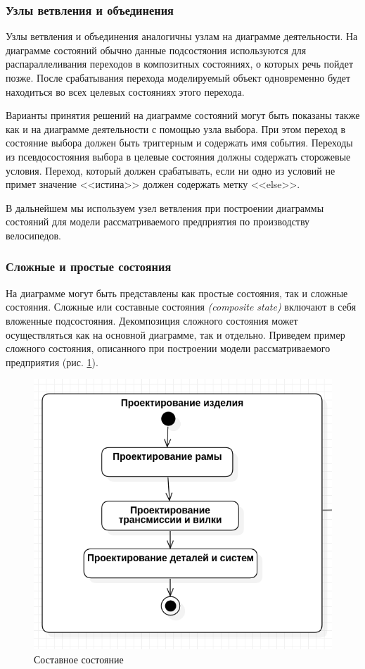 \documentclass[a4paper,12pt]{report}
\begin{document}
\subsubsection*{Узлы ветвления и объединения}
Узлы ветвления и объединения аналогичны узлам на диаграмме деятельности. На диаграмме состояний обычно данные подсостяония используются для распараллеливания переходов в композитных состояниях, о которых речь пойдет позже. После срабатывания перехода моделируемый объект одновременно будет находиться во всех целевых состояниях этого перехода. 

Варианты принятия решений на диаграмме состояний могут быть показаны также как и на диаграмме деятельности с помощью узла выбора. При этом переход в состояние выбора должен быть триггерным и содержать имя события. Переходы из псевдосостояния выбора в целевые состояния должны содержать сторожевые условия. Переход, который должен срабатывать, если ни одно из условий не примет значение <<истина>> должен содержать метку <<else>>. 

В дальнейшем мы используем узел ветвления при построении диаграммы состояний для модели рассматриваемого предприятия по производству велосипедов.

\subsubsection*{Сложные и простые состояния}

На диаграмме могут быть представлены как простые состояния, так и сложные состояния. Сложные или составные состояния \textit{(composite state)}  включают в себя вложенные подсостояния.  Декомпозиция сложного состояния может осуществляться как на основной диаграмме, так и отдельно. Приведем пример сложного состояния, описанного при построении модели рассматриваемого предприятия (рис. \ref{fig:statechartcomposestate}).

\begin{figure}
	\centering
	\includegraphics[width=0.4\linewidth]{images/statechartcomposestate}
	\caption{Составное состояние}
	\label{fig:statechartcomposestate}
\end{figure}
\end{document}
